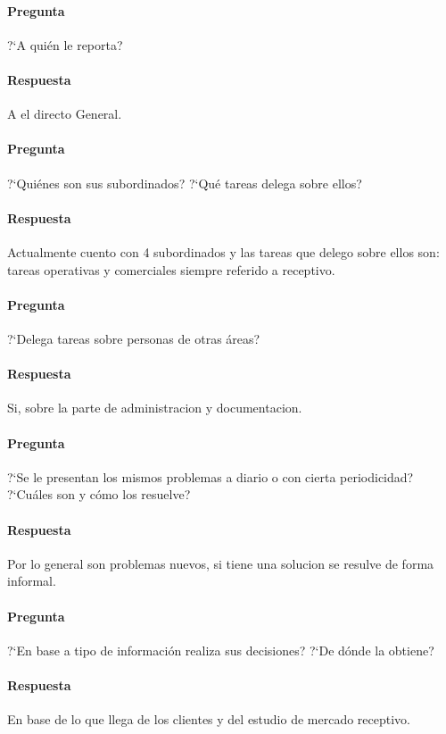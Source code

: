 \documentclass[12pt,a4paper,spanish]{article}
\begin{document}
	\paragraph{Pregunta}
	 ?`A qui\'en le reporta?
	\paragraph{Respuesta}
A el directo General.

	\paragraph{Pregunta}
	 ?`Qui\'enes son sus subordinados?  ?`Qu\'e tareas delega sobre ellos?
	\paragraph{Respuesta}
Actualmente cuento con 4 subordinados y las tareas que delego sobre ellos son:
tareas operativas y comerciales siempre referido a receptivo.

	\paragraph{Pregunta}
	 ?`Delega tareas sobre personas de otras \'areas?
	\paragraph{Respuesta}
Si, sobre la parte de administracion y documentacion.

	\paragraph{Pregunta}
	 ?`Se le presentan los mismos problemas a diario o con cierta periodicidad?  ?`Cu\'ales son y c\'omo los resuelve?
	\paragraph{Respuesta}
Por lo general son problemas nuevos, si tiene una solucion se resulve de forma informal.

	\paragraph{Pregunta}
	 ?`En base a tipo de informaci\'on realiza sus decisiones?  ?`De d\'onde la obtiene?
	\paragraph{Respuesta}
	En base de lo que llega de los clientes y del estudio de mercado receptivo.
\end{document}
